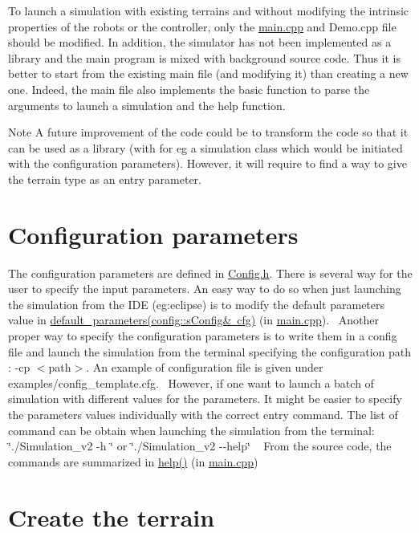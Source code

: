 To launch a simulation with existing terrains and without modifying the intrinsic properties of the robots or the controller, only the \mbox{\hyperlink{main_8cpp}{main.\+cpp}} and Demo.\+cpp file should be modified. In addition, the simulator has not been implemented as a library and the main program is mixed with background source code. Thus it is better to start from the existing main file (and modifying it) than creating a new one. Indeed, the main file also implements the basic function to parse the arguments to launch a simulation and the help function. \begin{DoxyNote}{Note}
A future improvement of the code could be to transform the code so that it can be used as a library (with for eg a simulation class which would be initiated with the configuration parameters). However, it will require to find a way to give the terrain type as an entry parameter.
\end{DoxyNote}
\hypertarget{index_param}{}\section{Configuration parameters}\label{index_param}
The configuration parameters are defined in \mbox{\hyperlink{_config_8h}{Config.\+h}}. There is several way for the user to specify the input parameters. An easy way to do so when just launching the simulation from the I\+DE (eg\+:eclipse) is to modify the default parameters value in \mbox{\hyperlink{main_8cpp_a075854c1227ffd274988d62bb5c859a1}{default\+\_\+parameters(config\+::s\+Config\& cfg)}} (in \mbox{\hyperlink{main_8cpp}{main.\+cpp}}).~\newline
 Another proper way to specify the configuration parameters is to write them in a config file and launch the simulation from the terminal specifying the configuration path \+: -\/cp $<$path$>$. An example of configuration file is given under examples/config\+\_\+template.\+cfg.~\newline
 However, if one want to launch a batch of simulation with different values for the parameters. It might be easier to specify the parameters values individually with the correct entry command. The list of command can be obtain when launching the simulation from the terminal\+: \char`\"{}./\+Simulation\+\_\+v2 -\/h \char`\"{} or \char`\"{}./\+Simulation\+\_\+v2 -\/-\/help\char`\"{} ~\newline
 From the source code, the commands are summarized in \mbox{\hyperlink{main_8cpp_a97ee70a8770dc30d06c744b24eb2fcfc}{help()}} (in \mbox{\hyperlink{main_8cpp}{main.\+cpp}})\hypertarget{index_terrain}{}\section{Create the terrain}\label{index_terrain}
